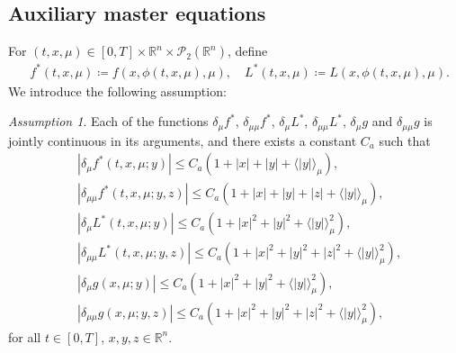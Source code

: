 \documentclass{amsart}
\theoremstyle{definition}
\theoremstyle{remark}
\newtheorem{assumption}[theorem]{Assumption}
\numberwithin{equation}{section}
\begin{document}
\subsection{Auxiliary master equations}

For $(t,x, \mu)\in [0,T]\times \mathbb{R}^n\times {\mathcal P}_2(\mathbb{R}^n)$,  define
 \begin{align*}
& f^*(t,x,\mu)\coloneqq f(x, \phi(t, x,\mu), \mu),\quad    L^*(t,x,\mu)\coloneqq L(x, \phi(t, x,\mu), \mu)  .
 \end{align*}
We introduce the following assumption:

\begin{assumption}\label{assum:flg}
Each of the functions $ \delta_\mu f^*$, $ \delta_{\mu\mu} f^*$, $ \delta_\mu L^*$, $ \delta_{\mu\mu} L^*$, $ \delta_\mu g$ and $ \delta_{\mu\mu} g$ is jointly continuous in its arguments, and
there exists a constant $C_a$ such that
\begin{align*}
&|\delta_\mu f^*(t, x, \mu;y)| \le C_a(1+|x|+ |y|+\langle |y| \rangle_{\mu}  ),   \\
& |\delta_{\mu\mu} f^*(t, x, \mu;y,z)| \le C_a(1+|x|+ |y|+|z|+\langle |y| \rangle_{\mu}   ),    \\
 &|\delta_{\mu} L^*(t, x, \mu; y) |\le C_a(1+|x|^2+ |y|^2+\langle |y| \rangle_{\mu}^2),\\
&|\delta_{\mu\mu} L^*(t, x, \mu; y,z) |\le C_a(1+|x|^2+ |y|^2+|z|^2+\langle |y| \rangle_{\mu}^2),\\
&|\delta_{\mu} g( x, \mu; y) |\le C_a(1+ |x|^2+|y|^2+\langle |y| \rangle_{\mu}^2),\\
& |\delta_{\mu\mu} g( x, \mu; y,z) |\le C_a(1+ |x|^2+|y|^2+|z|^2+\langle |y| \rangle_{\mu}^2),
\end{align*}
for all $t\in [0,T]$, $x,y,z\in\mathbb{R}^n $.
\end{assumption}
\end{document}
